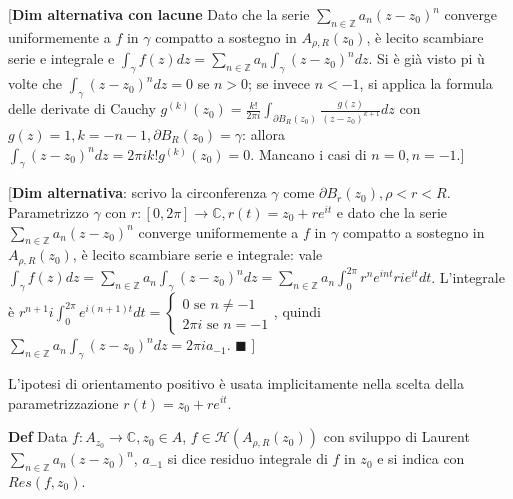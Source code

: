\documentclass{article}
\begin{document}
[\textbf{Dim alternativa con lacune} Dato che la serie $\sum_{n\in 
\mathbb{Z}
}a_{n}\left( z-z_{0}\right) ^{n}$ converge uniformemente a $f$ in $\gamma $
compatto a sostegno in $A_{\rho ,R}\left( z_{0}\right) $, \`{e} lecito
scambiare serie e integrale e $\int_{\gamma }f\left( z\right) dz=\sum_{n\in 
\mathbb{Z}
}a_{n}\int_{\gamma }\left( z-z_{0}\right) ^{n}dz$. Si \`{e} gi\`{a} visto pi%
\`{u} volte che $\int_{\gamma }\left( z-z_{0}\right) ^{n}dz=0$ se $n>0$; se
invece $n<-1$, si applica la formula delle derivate di Cauchy $g^{\left(
k\right) }\left( z_{0}\right) =\frac{k!}{2\pi i}\int_{\partial B_{R}\left(
z_{0}\right) }\frac{g\left( z\right) }{\left( z-z_{0}\right) ^{k+1}}dz$ con $%
g\left( z\right) =1,k=-n-1,\partial B_{R}\left( z_{0}\right) =\gamma $:
allora $\int_{\gamma }\left( z-z_{0}\right) ^{n}dz=2\pi ik!g^{\left(
k\right) }\left( z_{0}\right) =0$. Mancano i casi di $n=0,n=-1$.]

[\textbf{Dim alternativa}: scrivo la circonferenza $\gamma $ come $\partial
B_{r}\left( z_{0}\right) ,\rho <r<R$. Parametrizzo $\gamma $ con $r:\left[
0,2\pi \right] \rightarrow 
\mathbb{C}
,r\left( t\right) =z_{0}+re^{it}$ e dato che la serie $\sum_{n\in 
\mathbb{Z}
}a_{n}\left( z-z_{0}\right) ^{n}$ converge uniformemente a $f$ in $\gamma $
compatto a sostegno in $A_{\rho ,R}\left( z_{0}\right) $, \`{e} lecito
scambiare serie e integrale: vale $\int_{\gamma }f\left( z\right)
dz=\sum_{n\in 
\mathbb{Z}
}a_{n}\int_{\gamma }\left( z-z_{0}\right) ^{n}dz=\sum_{n\in 
\mathbb{Z}
}a_{n}\int_{0}^{2\pi }r^{n}e^{int}rie^{it}dt$. L'integrale \`{e} $%
r^{n+1}i\int_{0}^{2\pi }e^{i\left( n+1\right) t}dt=\left\{ 
\begin{array}{c}
0\text{ se }n\neq -1 \\ 
2\pi i\text{ se }n=-1%
\end{array}%
\right. $, quindi $\sum_{n\in 
\mathbb{Z}
}a_{n}\int_{\gamma }\left( z-z_{0}\right) ^{n}dz=2\pi ia_{-1}$. $%
\blacksquare $ ]

L'ipotesi di orientamento positivo \`{e} usata implicitamente nella scelta
della parametrizzazione $r\left( t\right) =z_{0}+re^{it}$.

\textbf{Def} Data $f:A_{z_{0}}\rightarrow 
\mathbb{C}
,z_{0}\in A$, $f\in \mathcal{H}\left( A_{\rho ,R}\left( z_{0}\right) \right) 
$ con sviluppo di Laurent $\sum_{n\in 
\mathbb{Z}
}a_{n}\left( z-z_{0}\right) ^{n}$, $a_{-1}$ si dice residuo integrale di $f$
in $z_{0}$ e si indica con $Res\left( f,z_{0}\right) $.
\end{document}
